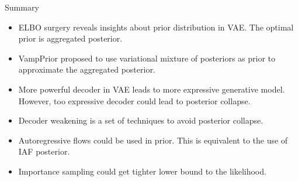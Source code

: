 \documentclass{beamer}
\begin{document}
\begin{frame}{Summary}
	\begin{itemize}
		\item ELBO surgery reveals insights about prior distribution in VAE. The optimal prior is aggregated posterior.
		\item VampPrior proposed to use variational mixture of posteriors as prior to approximate the aggregated posterior.
		\item More powerful decoder in VAE leads to more expressive generative model. However, too expressive decoder could lead to posterior collapse.
		\item Decoder weakening is a set of techniques to avoid posterior collapse.
		\item Autoregressive flows could be used in prior. This is equivalent to the use of IAF posterior. 
		\item Importance sampling could get tighter lower bound to the likelihood.
	\end{itemize}
\end{frame}
\end{document}
